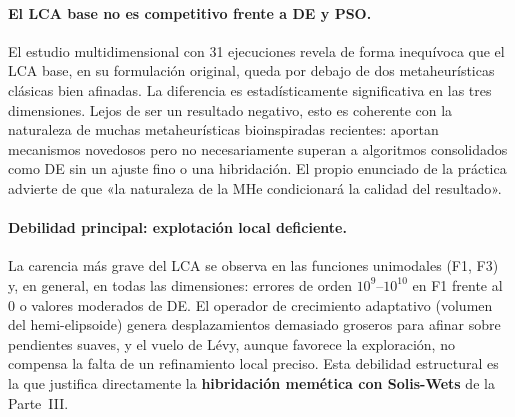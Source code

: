 \paragraph{El LCA base no es competitivo frente a DE y PSO.}
El estudio multidimensional con 31 ejecuciones revela de forma inequívoca que el LCA base,
en su formulación original, queda por debajo de dos metaheurísticas clásicas bien
afinadas. La diferencia es estadísticamente significativa en las tres dimensiones. Lejos de
ser un resultado negativo, esto es coherente con la naturaleza de muchas metaheurísticas
bioinspiradas recientes: aportan mecanismos novedosos pero no necesariamente superan a
algoritmos consolidados como DE sin un ajuste fino o una hibridación. El propio enunciado de
la práctica advierte de que «la naturaleza de la MHe condicionará la calidad del resultado».

\paragraph{Debilidad principal: explotación local deficiente.}
La carencia más grave del LCA se observa en las funciones unimodales (F1, F3) y, en general,
en todas las dimensiones: errores de orden $10^{9}$--$10^{10}$ en F1 frente al $0$ o valores
moderados de DE. El operador de crecimiento adaptativo (volumen del hemi-elipsoide) genera
desplazamientos demasiado groseros para afinar sobre pendientes suaves, y el vuelo de Lévy,
aunque favorece la exploración, no compensa la falta de un refinamiento local preciso. Esta
debilidad estructural es la que justifica directamente la \textbf{hibridación memética con
Solis-Wets} de la Parte~III.

